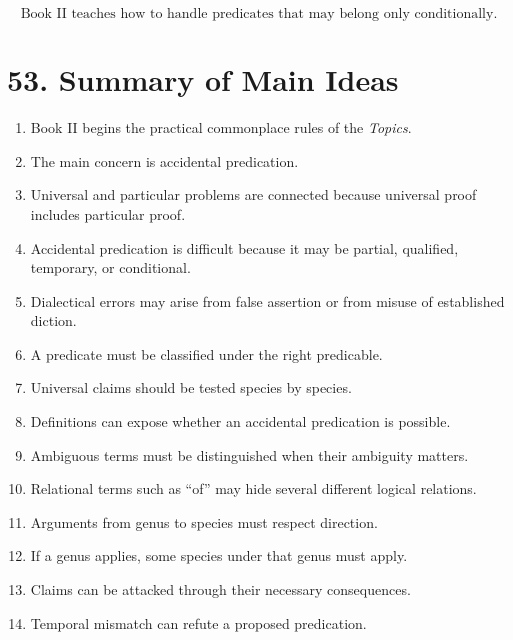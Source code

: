\documentclass[12pt]{article}
\begin{document}
\[
\boxed{
\text{Book II teaches how to handle predicates that may belong only conditionally.}
}
\]

\section*{53. Summary of Main Ideas}

\begin{enumerate}[itemsep=0.5em]
    \item Book II begins the practical commonplace rules of the
    \textit{Topics}.

    \item The main concern is accidental predication.

    \item Universal and particular problems are connected because universal
    proof includes particular proof.

    \item Accidental predication is difficult because it may be partial,
    qualified, temporary, or conditional.

    \item Dialectical errors may arise from false assertion or from misuse of
    established diction.

    \item A predicate must be classified under the right predicable.

    \item Universal claims should be tested species by species.

    \item Definitions can expose whether an accidental predication is possible.

    \item Ambiguous terms must be distinguished when their ambiguity matters.

    \item Relational terms such as ``of'' may hide several different logical
    relations.

    \item Arguments from genus to species must respect direction.

    \item If a genus applies, some species under that genus must apply.

    \item Claims can be attacked through their necessary consequences.

    \item Temporal mismatch can refute a proposed predication.


\end{enumerate}
\end{document}
